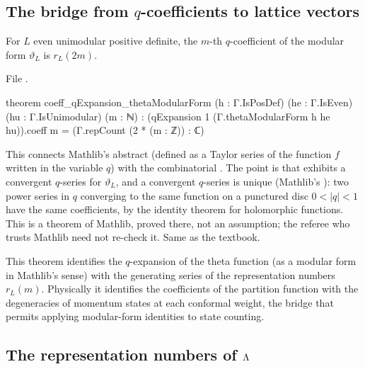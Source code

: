 \subsection{\texorpdfstring{The bridge from $q$-coefficients to lattice vectors}{The bridge from q-coefficients to lattice vectors}}

\begin{theorem}\label{ch02:thm:bridgeq}
For $L$ even unimodular positive definite, the $m$-th $q$-coefficient of the modular form
$\vartheta_L$ is $r_L(2m)$.
\end{theorem}
\noindent File .
\begin{leancode}
theorem coeff_qExpansion_thetaModularForm (h : Γ.IsPosDef) (he : Γ.IsEven) (hu : Γ.IsUnimodular)
    (m : ℕ) :
    (qExpansion 1 (Γ.thetaModularForm h he hu)).coeff m = (Γ.repCount (2 * (m : ℤ)) : ℂ)
\end{leancode}
\begin{dictionary}
This connects Mathlib's abstract  (defined as a Taylor series of the function
$f$ written in the variable $q$) with the combinatorial .  The point is that
 exhibits a convergent $q$-series for $\vartheta_L$, and a convergent
$q$-series is unique (Mathlib's ): two power
series in $q$ converging to the same function on a punctured disc $0<|q|<1$ have the same
coefficients, by the identity theorem for holomorphic functions.  This is a theorem of Mathlib,
proved there, not an assumption; the referee who trusts Mathlib need not re-check it.  Same as
the textbook.
\end{dictionary}
\begin{physics}
This theorem identifies the $q$-expansion of the theta function (as a modular form in Mathlib's sense) with the generating series of the representation numbers $r_L(m)$. Physically it identifies the coefficients of the partition function with the degeneracies of momentum states at each conformal weight, the bridge that permits applying modular-form identities to state counting.
\end{physics}

\subsection{\texorpdfstring{The representation numbers of ${\Lambda}$}{The representation numbers of the Leech lattice}}\label{ch02:sec:repcounts}

